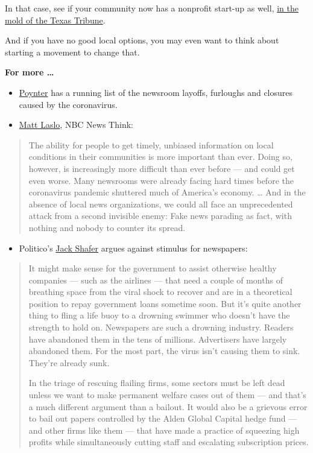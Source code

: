 In that case, see if your community now has a nonprofit start-up as
well,
\href{https://www.nytimes3xbfgragh.onion/2019/12/10/opinion/local-news.html}{in
the mold of the Texas Tribune}.

And if you have no good local options, you may even want to think about
starting a movement to change that.

\textbf{For more \ldots{}}

\begin{itemize}
\item
  \href{https://www.poynter.org/business-work/2020/here-are-the-newsroom-layoffs-furloughs-and-closures-caused-by-the-coronavirus/}{Poynter}
  has a running list of the newsroom layoffs, furloughs and closures
  caused by the coronavirus.
\item
  \href{https://www.nbcnews.com/think/opinion/coronavirus-revealing-why-local-news-so-important-it-s-also-ncna1186261}{Matt
  Laslo}, NBC News Think:
\end{itemize}

\begin{quote}
The ability for people to get timely, unbiased information on local
conditions in their communities is more important than ever. Doing so,
however, is increasingly more difficult than ever before --- and could
get even worse. Many newsrooms were already facing hard times before the
coronavirus pandemic shuttered much of America's economy. \ldots{} And
in the absence of local news organizations, we could all face an
unprecedented attack from a second invisible enemy: Fake news parading
as fact, with nothing and nobody to counter its spread.
\end{quote}

\begin{itemize}
\tightlist
\item
  Politico's
  \href{https://www.politico.com/news/magazine/2020/04/20/dont-waste-stimulus-money-on-newspapers-197015}{Jack
  Shafer} argues against stimulus for newspapers:
\end{itemize}

\begin{quote}
It might make sense for the government to assist otherwise healthy
companies --- such as the airlines --- that need a couple of months of
breathing space from the viral shock to recover and are in a theoretical
position to repay government loans sometime soon. But it's quite another
thing to fling a life buoy to a drowning swimmer who doesn't have the
strength to hold on. Newspapers are such a drowning industry. Readers
have abandoned them in the tens of millions. Advertisers have largely
abandoned them. For the most part, the virus isn't causing them to sink.
They're already sunk.

In the triage of rescuing flailing firms, some sectors must be left dead
unless we want to make permanent welfare cases out of them --- and
that's a much different argument than a bailout. It would also be a
grievous error to bail out papers controlled by the Alden Global Capital
hedge fund --- and other firms like them --- that have made a practice
of squeezing high profits while simultaneously cutting staff and
escalating subscription prices.
\end{quote}

